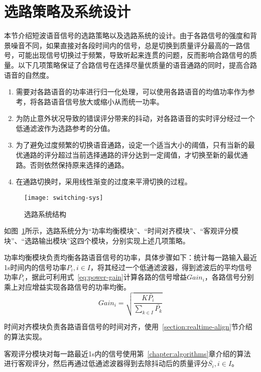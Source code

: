 \section{选路策略及系统设计}

本节介绍短波语音信号的选路策略以及选路系统的设计。由于各路信号的强度和背景噪音不同，如果直接对各段时间内的信号，总是切换到质量评分最高的一路信号，可能出现信号切换过于频繁，导致听起来连贯的问题，反而影响合路信号的质量。以下几项策略保证了合路信号在选择尽量优质量的语音通路的同时，提高合路语音的自然度。

\begin{enumerate}
    \item 需要对各路语音的功率进行归一化处理，可以使用各路语音的均值功率作为参考，将各路语音信号放大或缩小从而统一功率。
    \item 为防止意外状况导致的错误评分带来的抖动，对各路语音的实时评分经过一个低通滤波作为选路参考的分值。
    \item 为了避免过度频繁的切换语音通路，设定一个适当大小的阈值，只有当新的最优通路的评分超过当前选择通路的评分达到一定阈值，才切换至新的最优通路。否则依然保持原来选择的通路。 
    \item 在通路切换时，采用线性渐变的过度来平滑切换的过程。
\end{enumerate}

\begin{figure}
\centering
\texttt{[image: switching-sys]}
\caption{选路系统结构\label{fig:switching-sys}}
\end{figure}

如图~\ref{fig:switching-sys}所示，选路系统分为“功率均衡模块”、“时间对齐模块”、“客观评分模块”、“选路输出模块”这四个模块，分别实现上述几项策略。

功率均衡模块负责均衡各路语音信号的功率，具体步骤如下：统计每一路输入最近1s时间内的信号功率$P_i, i \in I$，将其经过一个低通滤波器，得到滤波后的平均信号功率$\bar{P_i}$，据此可利用式~\ref{eq:power-gain}计算各路的信号增益$Gain_i$，各路信号分别乘上对应增益实现各路信号的功率均衡。
\begin{equation}\label{eq:power-gain}
Gain_i = \sqrt{\frac {K\bar{P_i}} {\sum_{k \in I}{\bar{P_k}}} }
\end{equation}

时间对齐模块负责各路语音信号的时间对齐，使用~\ref{section:realtime-align}节介绍的算法实现。

客观评分模块对每一路最近1s内的信号使用第~\ref{chapter:algorithms}章介绍的算法进行客观评分，然后再通过低通滤波器得到去除抖动后的质量评分$\bar{S_i}, i \in I$。

